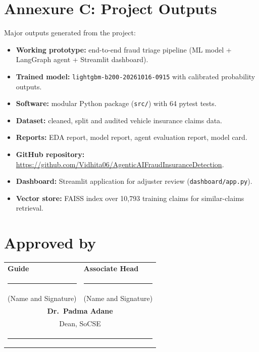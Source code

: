 \documentclass[12pt,a4paper]{article}
\begin{document}
\newpage
\section*{Annexure C: Project Outputs}

Major outputs generated from the project:

\begin{itemize}
    \item \textbf{Working prototype:} end-to-end fraud triage pipeline (ML model + LangGraph agent + Streamlit dashboard).
    \item \textbf{Trained model:} \texttt{lightgbm-b200-20261016-0915} with calibrated probability outputs.
    \item \textbf{Software:} modular Python package (\texttt{src/}) with 64 pytest tests.
    \item \textbf{Dataset:} cleaned, split and audited vehicle insurance claims data.
    \item \textbf{Reports:} EDA report, model report, agent evaluation report, model card.
    \item \textbf{GitHub repository:} \url{https://github.com/Vidhita06/AgenticAIFraudInsuranceDetection}.
    \item \textbf{Dashboard:} Streamlit application for adjuster review (\texttt{dashboard/app.py}).
    \item \textbf{Vector store:} FAISS index over 10,793 training claims for similar-claims retrieval.
\end{itemize}


\newpage
\section*{Approved by}

\vspace{2cm}

\begin{tabular}{@{}p{6cm}p{6cm}@{}}
\textbf{Guide} & \textbf{Associate Head} \\[3cm]
\rule{5cm}{0.4pt} & \rule{5cm}{0.4pt} \\
(Name and Signature) & (Name and Signature) \\[3cm]
\multicolumn{2}{c}{\textbf{Dr.\ Padma Adane}} \\
\multicolumn{2}{c}{Dean, SoCSE} \\[1cm]
\multicolumn{2}{c}{\rule{5cm}{0.4pt}} \\
\end{tabular}
\end{document}
